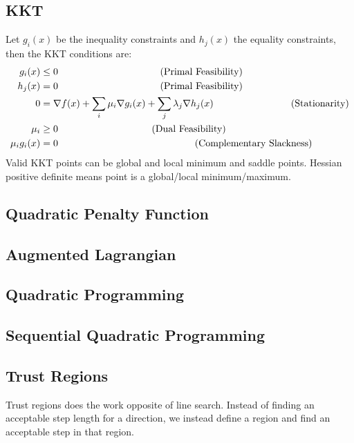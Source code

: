 \documentclass[a4paper, fleqn]{article}
\newcommand{\comment}[1]{%
  \text{\phantom{(#1)}} \tag{#1}}
\begin{document}
\subsection{KKT}
Let $g_i(x)$ be the inequality constraints and $h_j(x)$ the equality constraints, then
the KKT conditions are:
\begin{align*}
  g_i(x)&\leq 0 \comment{Primal Feasibility} \\
  h_j(x)&=0 \comment{Primal Feasibility} \\
  0 &= \nabla f(x)+\sum_i \mu_i\nabla g_i(x)+\sum_j \lambda_j\nabla h_j(x)
  \comment{Stationarity} \\
  \mu_i &\geq 0 \comment{Dual Feasibility} \\
  \mu_ig_i(x)&=0 \comment{Complementary Slackness}
\end{align*}
Valid KKT points can be global and local minimum and saddle points. Hessian positive definite means point is a global/local minimum/maximum.

\subsection{Quadratic Penalty Function}



\subsection{Augmented Lagrangian}

\subsection{Quadratic Programming}

\subsection{Sequential Quadratic Programming}

\subsection{Trust Regions}
Trust regions does the work opposite of line search. Instead of finding an acceptable
step length for a direction, we instead define a region and find an acceptable step in
that region.
\end{document}
